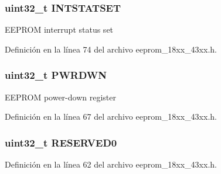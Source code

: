 \subsubsection[{\texorpdfstring{I\+N\+T\+S\+T\+A\+T\+S\+ET}{INTSTATSET}}]{ uint32\+\_\+t I\+N\+T\+S\+T\+A\+T\+S\+ET}\hypertarget{struct_l_p_c___e_e_p_r_o_m___t_ab0c820e81292af010c0f40818c44779b}{}\label{struct_l_p_c___e_e_p_r_o_m___t_ab0c820e81292af010c0f40818c44779b}
E\+E\+P\+R\+OM interrupt status set 

Definición en la línea 74 del archivo eeprom\+\_\+18xx\+\_\+43xx.\+h.

\subsubsection[{\texorpdfstring{P\+W\+R\+D\+WN}{PWRDWN}}]{ uint32\+\_\+t P\+W\+R\+D\+WN}\hypertarget{struct_l_p_c___e_e_p_r_o_m___t_a8da250a9c7b3373527699c56b6f9671c}{}\label{struct_l_p_c___e_e_p_r_o_m___t_a8da250a9c7b3373527699c56b6f9671c}
E\+E\+P\+R\+OM power-\/down register 

Definición en la línea 67 del archivo eeprom\+\_\+18xx\+\_\+43xx.\+h.

\subsubsection[{\texorpdfstring{R\+E\+S\+E\+R\+V\+E\+D0}{RESERVED0}}]{\setlength{\rightskip}{0pt plus 5cm}uint32\+\_\+t R\+E\+S\+E\+R\+V\+E\+D0}\hypertarget{struct_l_p_c___e_e_p_r_o_m___t_af86c61a5d38a4fc9cef942a12744486b}{}\label{struct_l_p_c___e_e_p_r_o_m___t_af86c61a5d38a4fc9cef942a12744486b}


Definición en la línea 62 del archivo eeprom\+\_\+18xx\+\_\+43xx.\+h.

